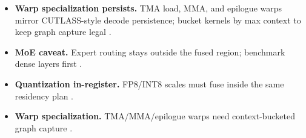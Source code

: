 \begin{itemize}
\item \textbf{Warp specialization persists.} TMA load, MMA, and epilogue warps mirror CUTLASS-style decode persistence; bucket kernels by max context to keep graph capture legal \citep{semianalysis2024tma,nvidia2022hopper,nvidia2024cudagraphs,yirage2026,taxbreak2026,memoryfloor2026,patel2025llminference,chen2020compilerbasedhardw,dao2022flashattention,kwon2023vllm,liu2024deepseekv3,amd2024aie,amd2024xdna,dlbook,dao2023flashdecoding}.
\item \textbf{MoE caveat.} Expert routing stays outside the fused region; benchmark dense layers first \citep{liu2024deepseekv3,taxbreak2026,patel2025llminference,yirage2026,chen2020compilerbasedhardw,kwon2023vllm,memoryfloor2026,nvidia2024cudagraphs,amd2024aie,semianalysis2024tma,dao2022flashattention,dao2023flashdecoding,dlbook,amd2024xdna}.
\item \textbf{Quantization in-register.} FP8/INT8 scales must fuse inside the same residency plan \citep{patel2025llminference,liu2024deepseekv3,nvidia2022hopper,semianalysis2024tma,chen2020compilerbasedhardw,yirage2026,taxbreak2026,memoryfloor2026,dao2022flashattention,kwon2023vllm,nvidia2024cudagraphs,amd2024aie,amd2024xdna,dlbook,dao2023flashdecoding}.
\item \textbf{Warp specialization.} TMA/MMA/epilogue warps need context-bucketed graph capture \citep{semianalysis2024tma,nvidia2022hopper,nvidia2024cudagraphs,yirage2026,taxbreak2026,memoryfloor2026,patel2025llminference,chen2020compilerbasedhardw,dao2022flashattention,kwon2023vllm,liu2024deepseekv3,amd2024aie,amd2024xdna,dlbook,dao2023flashdecoding}.
\end{itemize}

